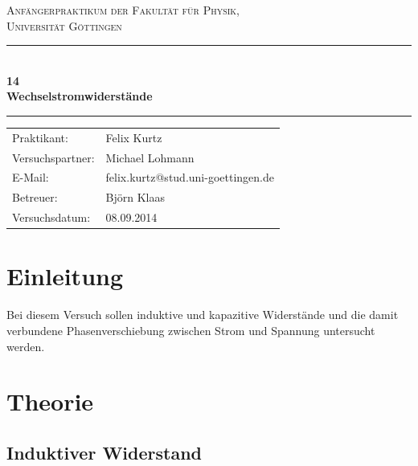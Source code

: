 \documentclass[12pt,a4paper,titlepage,headinclude,bibtotoc]{scrartcl}
\begin{document}
\begin{titlepage}
\centering
\textsc{\Large Anfängerpraktikum der Fakultät für
  Physik,\\[1.5ex] Universität Göttingen}

\vspace*{4.2cm}

\rule{\textwidth}{1pt}\\[0.5cm]
{\huge \bfseries
  14\\[1.5ex]
  Wechselstromwiderstände}\\[0.5cm]
\rule{\textwidth}{1pt}

\vspace*{2.5cm}

\begin{Large}
\begin{tabular}{ll}
Praktikant: & Felix Kurtz\\
Versuchspartner: & Michael Lohmann\\
 E-Mail: &  felix.kurtz@stud.uni-goettingen.de\\
 Betreuer: & Björn Klaas\\
 Versuchsdatum: & 08.09.2014\\
\end{tabular}
\end{Large}

\vspace*{0.8cm}

\begin{Large}
\end{Large}

\end{titlepage}

\tableofcontents

\newpage

\section{Einleitung}
\label{sec:einleitung}
Bei diesem Versuch sollen induktive und kapazitive Widerstände und die damit verbundene Phasenverschiebung zwischen Strom und Spannung untersucht werden.

\section{Theorie}
\label{sec:theorie}
\subsection{Induktiver Widerstand}
\end{document}
